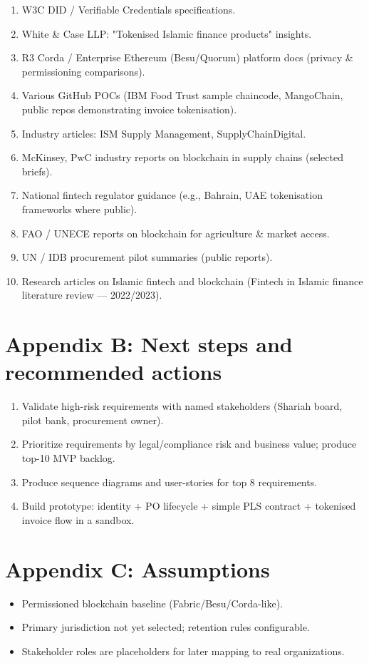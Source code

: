 \documentclass[11pt,a4paper]{article}
\begin{document}
\begin{enumerate}
\item W3C DID / Verifiable Credentials specifications.
\item White \& Case LLP: "Tokenised Islamic finance products" insights.
\item R3 Corda / Enterprise Ethereum (Besu/Quorum) platform docs (privacy \& permissioning comparisons).
\item Various GitHub POCs (IBM Food Trust sample chaincode, MangoChain, public repos demonstrating invoice tokenisation).
\item Industry articles: ISM Supply Management, SupplyChainDigital.
\item McKinsey, PwC industry reports on blockchain in supply chains (selected briefs).
\item National fintech regulator guidance (e.g., Bahrain, UAE tokenisation frameworks where public).
\item FAO / UNECE reports on blockchain for agriculture \& market access.
\item UN / IDB procurement pilot summaries (public reports).
\item Research articles on Islamic fintech and blockchain (Fintech in Islamic finance literature review — 2022/2023).
\end{enumerate}

\section{Appendix B: Next steps and recommended actions}
\begin{enumerate}
\item Validate high-risk requirements with named stakeholders (Shariah board, pilot bank, procurement owner).\
\item Prioritize requirements by legal/compliance risk and business value; produce top-10 MVP backlog.\
\item Produce sequence diagrams and user-stories for top 8 requirements.\
\item Build prototype: identity + PO lifecycle + simple PLS contract + tokenised invoice flow in a sandbox.
\end{enumerate}

\section{Appendix C: Assumptions}
\begin{itemize}
\item Permissioned blockchain baseline (Fabric/Besu/Corda-like).\
\item Primary jurisdiction not yet selected; retention rules configurable.\
\item Stakeholder roles are placeholders for later mapping to real organizations.\
\end{itemize}

\vfill\noindent
\hrulefill\\
\end{document}
